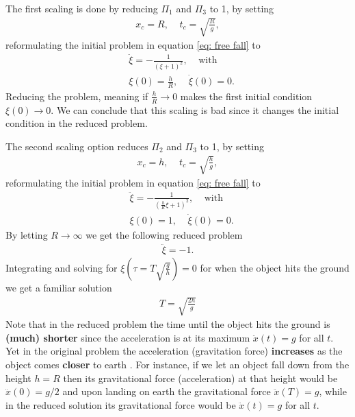\documentclass[a4paper]{article}
\begin{document}
The first scaling is done by reducing $\Pi_1$ and $\Pi_3$ to 1, by setting
\begin{align}
        x_c = R, \;\;\;\; t_c = \sqrt{\frac{R}{g}},
\end{align}
reformulating the initial problem in equation \ref{eq: free fall} to
\begin{align}
    &\ddot{\xi} = -\frac{1}{(\xi + 1)^2},\;\;\;\;
    \text{with} \nonumber\\
    &\xi(0) = \frac{h}{R}, \;\;\;\; \dot{\xi}(0) = 0.
\end{align}
Reducing the problem, meaning if $\frac{h}{R} \rightarrow 0$ makes the first
initial condition $\xi(0) \rightarrow 0$. We can conclude that this scaling
is bad since it changes the initial condition in the reduced problem.

The second scaling option reduces $\Pi_2$ and $\Pi_3$ to 1, by setting
\begin{align}
        x_c = h, \;\;\;\; t_c = \sqrt{\frac{h}{g}},
\end{align}
reformulating the initial problem in equation \ref{eq: free fall} to
\begin{align}
    &\ddot{\xi} = -\frac{1}{(\frac{h}{R}\xi + 1)^2},\;\;\;\;
    \text{with} \nonumber\\
    &\xi(0) = 1, \;\;\;\; \dot{\xi}(0) = 0.
\end{align}
By letting $R \rightarrow \infty$ we get the following reduced problem
\begin{align}\label{eq: free fall reduced}
    \ddot{\xi} = -1.
\end{align}
Integrating and solving for $\xi(\tau = T\sqrt{\frac{g}{h}}) = 0$ for when the
object hits the ground we get a familiar solution
\begin{align}
    T = \sqrt{\frac{2h}{g}}
\end{align}
Note that in the reduced problem the time until the object hits the ground is
\textbf{(much) shorter} since the acceleration is at its maximum $\ddot{x}(t) =
g$ for all $t$.  Yet in the original problem the acceleration (gravitation
force) \textbf{increases} as the object comes \textbf{closer} to earth . For
instance, if we let an object fall down from the height $h = R$ then its
gravitational force (acceleration) at that height would be $\ddot{x}(0) =
g/2$ and upon landing on earth the gravitational force $\ddot{x}(T) = g$,
while in the reduced solution its gravitational force would be $\ddot{x}(t) =
g$ for all $t$.
\end{document}
